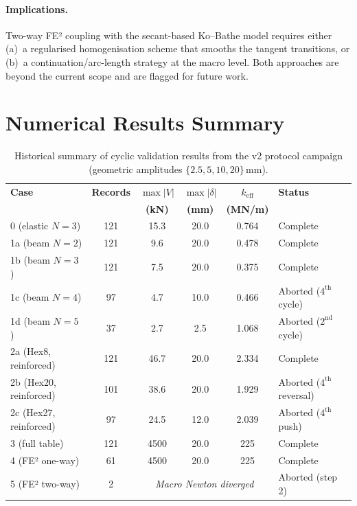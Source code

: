 \paragraph{Implications.}
Two-way FE² coupling with the secant-based Ko--Bathe model requires
either (a)~a regularised homogenisation scheme that smooths the
tangent transitions, or (b)~a continuation/arc-length strategy at
the macro level.  Both approaches are beyond the current scope and
are flagged for future work.


\section{Numerical Results Summary}
\label{sec:cyclic-results}

\begin{table}[htbp]
\centering
\caption{Historical summary of cyclic validation results from the v2 protocol
  campaign (geometric
  amplitudes $\{2.5, 5, 10, 20\}$\,mm).}
\label{tab:cyclic-results}
\begin{tabular}{lccccl}
\toprule
\textbf{Case} & \textbf{Records} &
  $\max|V|$ & $\max|\delta|$ &
  $k_{\text{eff}}$ &
  \textbf{Status} \\
  & & \textbf{(kN)} & \textbf{(mm)} & \textbf{(MN/m)} & \\
\midrule
0 (elastic $N\!=\!3$) & 121 &  15.3 & 20.0 & 0.764 & Complete \\
1a (beam $N\!=\!2$)   & 121 &   9.6 & 20.0 & 0.478 & Complete \\
1b (beam $N\!=\!3$)   & 121 &   7.5 & 20.0 & 0.375 & Complete \\
1c (beam $N\!=\!4$)   &  97 &   4.7 & 10.0 & 0.466 & Aborted ($4^{\text{th}}$ cycle) \\
1d (beam $N\!=\!5$)   &  37 &   2.7 &  2.5 & 1.068 & Aborted ($2^{\text{nd}}$ cycle) \\
2a (Hex8, reinforced)   & 121 &  46.7 & 20.0 & 2.334 & Complete \\
2b (Hex20, reinforced)  & 101 &  38.6 & 20.0 & 1.929 & Aborted ($4^{\text{th}}$ reversal) \\
2c (Hex27, reinforced)  &  97 &  24.5 & 12.0 & 2.039 & Aborted ($4^{\text{th}}$ push) \\
3 (full table)         & 121 & 4500  & 20.0 & 225   & Complete \\
4 (FE² one-way)        &  61  & 4500  & 20.0 & 225   & Complete \\
5 (FE² two-way)        &   2  & \multicolumn{3}{c}{\textit{Macro Newton diverged}} &
  Aborted (step 2) \\
\bottomrule
\end{tabular}
\end{table}

